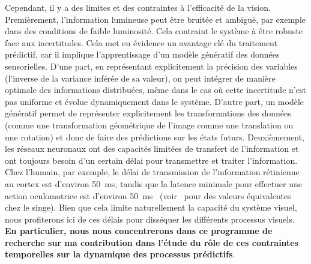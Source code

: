 \documentclass[11pt,french,a4paper,oneside]{article}%
\newcommand{\ms}{\si{\milli\second}}%
\begin{document}
Cependant, il y a des limites et des contraintes à l'efficacité de la
vision. Premièrement, l'information lumineuse peut être bruitée et
ambiguë, par exemple dans des conditions de faible luminosité. Cela
contraint le système à être robuste face aux incertitudes. Cela met en
évidence un avantage clé du traitement prédictif, car il implique
l'apprentissage d'un modèle génératif des données sensorielles. D'une
part, en représentant explicitement la précision des variables
(l'inverse de la variance inférée de sa valeur), on peut intégrer de
manière optimale des informations distribuées, même dans le cas où cette
incertitude n'est pas uniforme et évolue dynamiquement dans le système.
D'autre part, un modèle génératif permet de représenter explicitement
les transformations des données (comme une transformation géométrique de
l'image comme une translation ou une rotation) et donc de faire des
prédictions sur les états futurs. Deuxièmement, les réseaux neuronaux
ont des capacités limitées de transfert de l'information et ont toujours
besoin d'un certain délai pour transmettre et traiter l'information.
Chez l'humain, par exemple, le délai de transmission de l'information
rétinienne au cortex est d'environ 50~\ms, tandis que la latence minimale
pour effectuer une action oculomotrice est d'environ 50~\ms~\citep{Kirchner06}
 (voir~\citep{Lamme00} pour des valeurs
équivalentes chez le singe). Bien que cela limite naturellement la
capacité du système visuel, nous profiterons ici de ces délais pour
disséquer les différents processus visuels. {\bf En particulier, nous nous
concentrerons dans ce programme de recherche sur ma contribution dans l'étude
du rôle de ces contraintes
temporelles sur la dynamique des processus prédictifs}.
\end{document}
